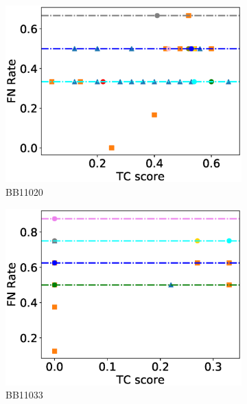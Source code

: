 \begin{figure}[!htbp]
\begin{adjustwidth}{-1cm}{-1cm}
\begin{subfigure}{0.26\textwidth}
			\includegraphics[width=\columnwidth]{Figure/summary/precomputedInit/Balibase/BB11020_fnrate_vs_tc_2}
			\caption{BB11020}
		\end{subfigure}
		\begin{subfigure}{0.26\textwidth}
			\includegraphics[width=\columnwidth]{Figure/summary/precomputedInit/Balibase/BB11033_fnrate_vs_tc_2}
			\caption{BB11033}
		\end{subfigure}    
		\begin{subfigure}{0.26\textwidth}

\end{subfigure}
\end{adjustwidth}
\end{figure}
